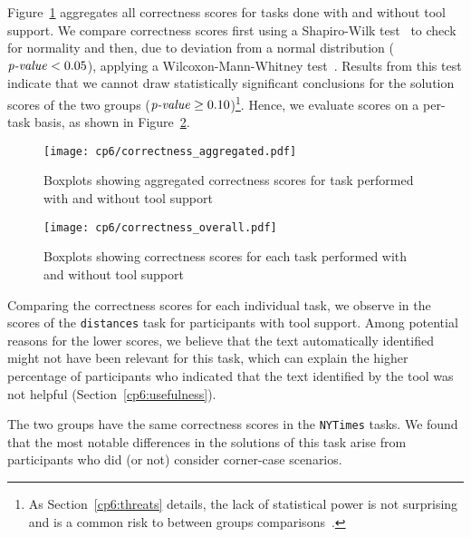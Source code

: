 Figure~\ref{fig:correctness-overall} aggregates all correctness scores for tasks done with and without tool support.
We compare correctness scores first using a Shapiro-Wilk test~\cite{wohlin2012} to check for normality and then, 
due to deviation from a normal distribution ($\text{\textit{p-value}} < 0.05$), applying a 
Wilcoxon-Mann-Whitney test~\cite{mannWhitneyU}.
Results from this test indicate that we cannot draw statistically significant conclusions
for the solution scores of the two groups ($\text{\textit{p-value}} \ge 0.10$)\footnote{
As Section~\ref{cp6:threats} details, the lack of statistical power is not surprising and is a common risk to between groups comparisons~\cite{Lazar2017}.}. Hence, we evaluate scores on a per-task basis, as shown in Figure~\ref{fig:correctness-by-task}.






\begin{figure}
    \centering
    \texttt{[image: cp6/correctness\_aggregated.pdf]}
    \caption{Boxplots showing aggregated correctness scores for task performed with and without tool support}
    \label{fig:correctness-overall}
\end{figure}


\begin{figure}
    \centering
    \texttt{[image: cp6/correctness\_overall.pdf]}
    \caption{Boxplots showing correctness scores for each task performed with and without tool support}
    \label{fig:correctness-by-task}
\end{figure}




Comparing the correctness scores for each individual task, we observe 
in the scores of 
the \texttt{distances} task for participants with tool support. 
Among potential reasons for  the lower scores, we believe that the text automatically identified 
might not have been relevant for this task, which can explain the higher percentage of participants
who indicated that the text identified by the tool was not helpful (Section~\ref{cp6:usefulness}).



The two groups have the same correctness scores in the \texttt{NYTimes} tasks.
We found that the most notable differences in the solutions of this task arise from participants who did (or not) consider corner-case scenarios.



